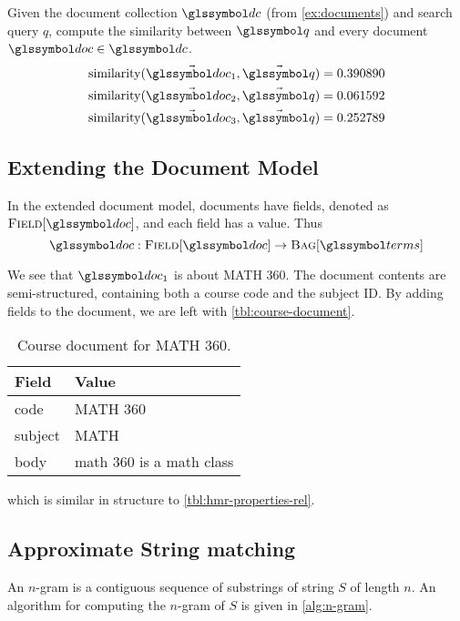 		\begin{ex}
			Given the document collection \(\dc\) (from \vref{ex:documents}) and search query \(q\), compute the similarity between \(\q\) and every document \(\doc \in \dc\).
			\begin{align}
				\similarity(\vec{\doc_1}, \vec{\q}) = 0.390890 \\
				\similarity(\vec{\doc_2}, \vec{\q}) = 0.061592 \\
				\similarity(\vec{\doc_3}, \vec{\q}) = 0.252789
			\end{align}
		\end{ex}
		
	\subsection{Extending the Document Model}
	\label{sec:extending-the-document-model}
		In the extended document model, documents have fields, denoted as \(\fields{\doc}\), and each field has a value.  Thus
		\[
			\doc : \fields{\doc} \to \bag{\terms}
		\]
		
		\begin{ex}
			We see that \(\doc_1\) is about MATH 360.  The document contents are semi-structured, containing both a course code and the subject ID.  By adding fields to the document, we are left with \vref{tbl:course-document}.
			
			\begin{table}[H]
				\centering
				
				\begin{tabular}{ll}
					\toprule
					Field & Value \\
					\midrule
					code & MATH 360 \\
					subject & MATH \\
					body & math 360 is a math class \\
					\bottomrule
				\end{tabular}
				
				\caption{Course document for MATH 360.}
				\label{tbl:course-document}
			\end{table}
			
			which is similar in structure to \vref{tbl:hmr-properties-rel}.
		\end{ex}
		
	\subsection{Approximate String matching}
	\label{sec:n-gram}
		\begin{defn}[N-Gram]
			An \(n\)-gram is a contiguous sequence of substrings of string \(S\) of length \(n\).	 An algorithm for computing the \(n\)-gram of \(S\) is given in \cref{alg:n-gram}. 
		\end{defn}
		
